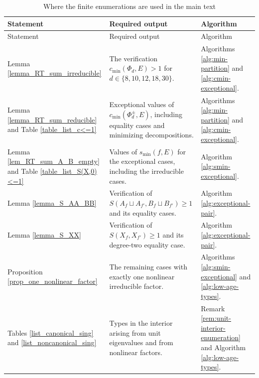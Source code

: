 \documentclass[11pt]{amsart}
\theoremstyle{plain}
\theoremstyle{definition}
\numberwithin{equation}{section}
\begin{document}
\small
\begin{longtable}{
  >{\raggedright\arraybackslash}p{}
  >{\raggedright\arraybackslash}p{}
  >{\raggedright\arraybackslash}p{}
}
\caption{Where the finite enumerations are used in the main text}
\label{tab:computer-assisted-map}\\
\toprule
Statement & Required output & Algorithm \\
\midrule
\endfirsthead

\toprule
Statement & Required output & Algorithm \\
\midrule
\endhead

Lemma \ref{lemma_RT_sum_irreducible}
&
The verification $c_{\min}(\Phi_d,E)>1$ for $d\in\{8,10,12,18,30\}$.
&
Algorithms \ref{alg:min-partition} and
\ref{alg:cmin-exceptional}.
\\
\addlinespace

Lemma \ref{lemma_RT_sum_reducible} and
Table \ref{table_list_c<=1}
&
Exceptional values of $c_{\min}(\Phi_d^\pm,E)$, including equality
cases and minimizing decompositions.
&
Algorithms \ref{alg:min-partition} and
\ref{alg:cmin-exceptional}.
\\
\addlinespace

Lemma \ref{lem_RT_sum_A_B_empty} and
Table \ref{table_list_S(X,0)<=1}
&
Values of $s_{\min}(f,E)$ for the exceptional cases,
including the irreducible cases.
&
Algorithm \ref{alg:smin-exceptional}.
\\
\addlinespace

Lemma \ref{lemma_S_AA_BB}
&
Verification of
$S(A_f\sqcup A_{f'},B_f\sqcup B_{f'})\geq1$
and its equality cases.
&
Algorithm \ref{alg:exceptional-pair}.
\\
\addlinespace


Lemma \ref{lemma_S_XX}
&
Verification of $S(X_f,X_{f'})\geq1$ and its degree-two equality
case.
&
Algorithm \ref{alg:exceptional-pair}.
\\
\addlinespace

Proposition \ref{prop_one_nonlinear_factor}
&
The remaining cases with exactly one nonlinear irreducible factor.
&
Algorithms \ref{alg:smin-exceptional} and
\ref{alg:low-age-types}.
\\
\addlinespace

Tables \ref{list_canonical_sing} and \ref{list_noncanonical_sing}
&
Types in the interior arising from unit eigenvalues and from
nonlinear factors.
&
Remark \ref{rem:unit-interior-enumeration} and
Algorithm \ref{alg:low-age-types}.
\\




\bottomrule
\end{longtable}
\normalsize




\end{document}

